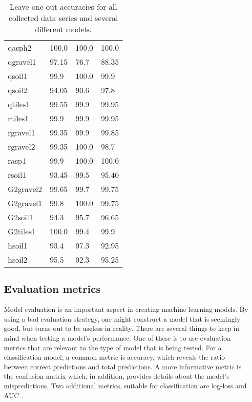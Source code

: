 \begin{table}
\begin{center}
\begin{tabular}{|l|l|l|l|}
qasph2& \cellcolor{green!20}100.0 & \cellcolor{green!20}100.0& 100.0\\
qgravel1& 97.15 & \cellcolor{red!20} 76.7 & 88.35\\
qsoil1 &99.9 & \cellcolor{green!20}100.0 & 99.9\\
qsoil2& 94.05 & \cellcolor{red!20} 90.6& 97.8\\
qtiles1& 99.55 & 99.9& 99.95\\
rtiles1 &99.9 & 99.9& 99.95\\
rgravel1& 99.35 & 99.9 & 99.85\\
rgravel2 &99.35 & \cellcolor{green!20}100.0 & 98.7\\
rasp1 &99.9 & 100.0 & 100.0\\
rsoil1 &\cellcolor{red!20} 93.45 & 99.5& 95.40\\
G2gravel2& 99.65& 99.7& 99.75\\ 
G2gravel1& 99.8 & \cellcolor{green!20}100.0& 99.75\\
G2soil1 &\cellcolor{red!20} 94.3 & 95.7& 96.65\\
G2tiles1& \cellcolor{green!20}100.0 & 99.4 & 99.9\\
hsoil1 &\cellcolor{red!20} 93.4 &97.3 & 92.95\\
hsoil2 &95.5 & \cellcolor{red!20} 92.3 & 95.25\\
\hline
  \end{tabular}
\end{center}
\label{tab:loo}
\caption{Leave-one-out accuracies for all collected data series and several different models.}
\end{table}

\subsection{Evaluation metrics}
Model evaluation is an important aspect in creating machine learning models. By using a bad evaluation strategy, one might construct a model that is seemingly good, but turns out to be useless in reality. There are several things to keep in mind when testing a model's performance. One of these is to use evaluation metrics that are relevant to the type of model that is being tested. For a classification model, a common metric is accuracy, which reveals the ratio between correct predictions and total predictions. A more informative metric is the confusion matrix which, in addition, provides details about the model's mispredictions. Two additional metrics, suitable for classification are log-loss and AUC \citep{zheng_2015}. 

